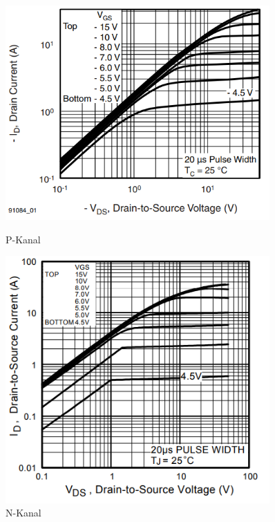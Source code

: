 \begin{figure}[H]
  \begin{minipage}[hbt]{0.45\textwidth}
    \includegraphics[width=0.9\textwidth]{Bilder/Kennlinien/P_Kanal}
 	\caption{P-Kanal}
  	\label{Pchannel}
  \end{minipage}
\hspace{.03\linewidth}
  \begin{minipage}[hbt]{0.45\textwidth}
    \includegraphics[width=0.9\textwidth]{Bilder/Kennlinien/N_Kanal}
  	\caption{N-Kanal}
  	\label{Nchannel}
  \end{minipage}
\end{figure}


